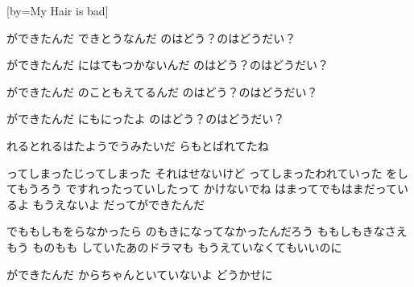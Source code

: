 \documentclass{article}
\newenvironment{Japanese}{%
\CJKfamily{min}%
\CJKtilde
\CJKnospace}{}
\begin{document}
\begin{CJK}{UTF8}{}
\begin{Japanese}
\begin{songs}{}
[by=My Hair is bad]
\beginverse

ができたんだ
できとうなんだ
のはどう？のはどうだい？

ができたんだ
にはてもつかないんだ
のはどう？のはどうだい？

ができたんだ
のこともえてるんだ
のはどう？のはどうだい？

ができたんだ
にもにったよ
のはどう？のはどうだい？

れるとれるはたようでうみたいだ
らもとばれてたね

ってしまったじってしまった
それはせないけど
ってしまったわれていった
をしてもうろう
ですれったっていしたって
かけないでね
はまってでもはまだっているよ
もうえないよ
だってができたんだ

でももしもをらなかったら
のもきになってなかったんだろう
ももしもきなさえもう
ものもも
していたあのドラマも
もうえていなくてもいいのに

ができたんだ
からちゃんといていないよ
どうかせに


\end{songs}
\end{Japanese}
\end{CJK}
\end{document}

